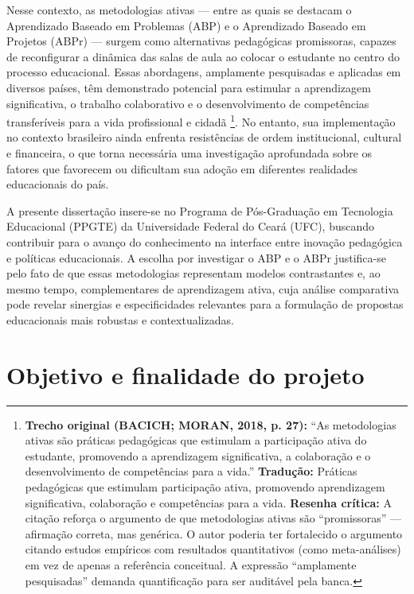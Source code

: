 Nesse contexto, as metodologias ativas — entre as quais se destacam o Aprendizado Baseado em Problemas (ABP) e o Aprendizado Baseado em Projetos (ABPr) — surgem como alternativas pedagógicas promissoras, capazes de reconfigurar a dinâmica das salas de aula ao colocar o estudante no centro do processo educacional. Essas abordagens, amplamente pesquisadas e aplicadas em diversos países, têm demonstrado potencial para estimular a aprendizagem significativa, o trabalho colaborativo e o desenvolvimento de competências transferíveis para a vida profissional e cidadã \cite{BACICH2018}\footnote{\textbf{Trecho original (BACICH; MORAN, 2018, p. 27):} ``As metodologias ativas são práticas pedagógicas que estimulam a participação ativa do estudante, promovendo a aprendizagem significativa, a colaboração e o desenvolvimento de competências para a vida.'' \textbf{Tradução:} Práticas pedagógicas que estimulam participação ativa, promovendo aprendizagem significativa, colaboração e competências para a vida. \textbf{Resenha crítica:} A citação reforça o argumento de que metodologias ativas são ``promissoras'' — afirmação correta, mas genérica. O autor poderia ter fortalecido o argumento citando estudos empíricos com resultados quantitativos (como meta-análises) em vez de apenas a referência conceitual. A expressão ``amplamente pesquisadas'' demanda quantificação para ser auditável pela banca.}. No entanto, sua implementação no contexto brasileiro ainda enfrenta resistências de ordem institucional, cultural e financeira, o que torna necessária uma investigação aprofundada sobre os fatores que favorecem ou dificultam sua adoção em diferentes realidades educacionais do país.

A presente dissertação insere-se no Programa de Pós-Graduação em Tecnologia Educacional (PPGTE) da Universidade Federal do Ceará (UFC), buscando contribuir para o avanço do conhecimento na interface entre inovação pedagógica e políticas educacionais. A escolha por investigar o ABP e o ABPr justifica-se pelo fato de que essas metodologias representam modelos contrastantes e, ao mesmo tempo, complementares de aprendizagem ativa, cuja análise comparativa pode revelar sinergias e especificidades relevantes para a formulação de propostas educacionais mais robustas e contextualizadas.

\section{Objetivo e finalidade do projeto}
\label{sec:objetivo_finalidade}

